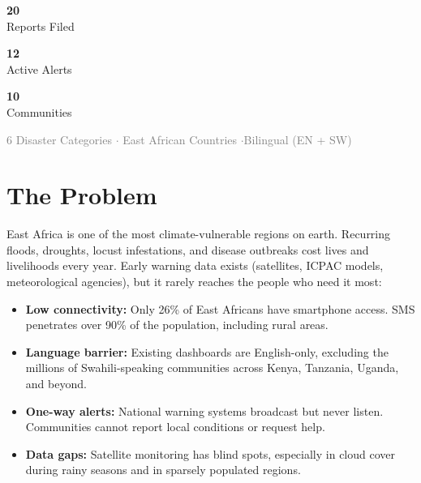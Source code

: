 \documentclass[11pt,a4paper]{article}
\begin{document}
\vspace{0.4cm}
\begin{center}
  \begin{minipage}{0.30\textwidth}
    \centering
    \textcolor{accent}{\fontsize{32}{38}\selectfont\bfseries 20}\\[-0.2cm]
    \textcolor{dark}{\small Reports Filed}
  \end{minipage}
  \hfill
  \begin{minipage}{0.30\textwidth}
    \centering
    \textcolor{accent}{\fontsize{32}{38}\selectfont\bfseries 12}\\[-0.2cm]
    \textcolor{dark}{\small Active Alerts}
  \end{minipage}
  \hfill
  \begin{minipage}{0.30\textwidth}
    \centering
    \textcolor{accent}{\fontsize{32}{38}\selectfont\bfseries 10}\\[-0.2cm]
    \textcolor{dark}{\small Communities}
  \end{minipage}
\end{center}
\vspace{0.2cm}
\begin{center}
  \textcolor{grey}{\small 6 Disaster Categories \quad$\cdot$ East African Countries \quad$\cdot$\quad Bilingual (EN + SW)}
\end{center}

\section{The Problem}

East Africa is one of the most climate-vulnerable regions on earth. Recurring floods, droughts, locust infestations, and disease outbreaks cost lives and livelihoods every year. Early warning data exists (satellites, ICPAC models, meteorological agencies), but it rarely reaches the people who need it most:

\begin{itemize}[leftmargin=1.2em]
  \item \textbf{Low connectivity:} Only 26\% of East Africans have smartphone access. SMS penetrates over 90\% of the population, including rural areas.
  \item \textbf{Language barrier:} Existing dashboards are English-only, excluding the millions of Swahili-speaking communities across Kenya, Tanzania, Uganda, and beyond.
  \item \textbf{One-way alerts:} National warning systems broadcast but never listen. Communities cannot report local conditions or request help.
  \item \textbf{Data gaps:} Satellite monitoring has blind spots, especially in cloud cover during rainy seasons and in sparsely populated regions.
\end{itemize}
\end{document}
